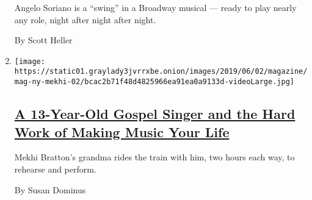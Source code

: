 \begin{enumerate}
  Angelo Soriano is a ``swing'' in a Broadway musical --- ready to play
  nearly any role, night after night after night.

  By Scott Heller
\item
  \texttt{[image: https://static01.graylady3jvrrxbe.onion/images/2019/06/02/magazine/mag-ny-mekhi-02/bcac2b71f48d4825966ea91ea0a9133d-videoLarge.jpg]}

  \hypertarget{a-13-year-old-gospel-singer-and-the-hard-work-of-making-music-your-life}{%
  \subsection{\texorpdfstring{\href{/interactive/2019/05/30/magazine/gospel-singer-new-york.html}{A
  13-Year-Old Gospel Singer and the Hard Work of Making Music Your
  Life}}{A 13-Year-Old Gospel Singer and the Hard Work of Making Music Your Life}}\label{a-13-year-old-gospel-singer-and-the-hard-work-of-making-music-your-life}}

  Mekhi Bratton's grandma rides the train with him, two hours each way,
  to rehearse and perform.

  By Susan Dominus
\end{enumerate}

